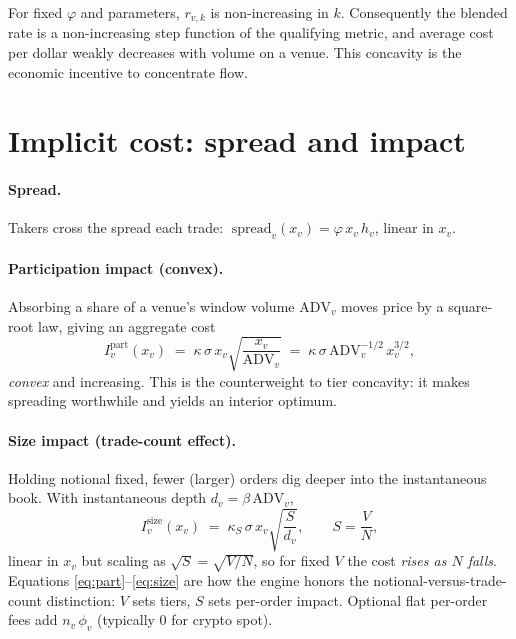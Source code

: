 \documentclass[11pt]{article}
\begin{document}
\begin{proposition}
For fixed $\varphi$ and parameters, $r_{v,k}$ is non-increasing in $k$.
Consequently the blended rate is a non-increasing step function of the
qualifying metric, and average cost per dollar weakly decreases with volume on a
venue. This concavity is the economic incentive to concentrate flow.
\end{proposition}

\section{Implicit cost: spread and impact}
\paragraph{Spread.} Takers cross the spread each trade:
$\;\text{spread}_v(x_v) = \varphi\,x_v\,h_v$, linear in $x_v$.

\paragraph{Participation impact (convex).} Absorbing a share of a venue's window
volume $\mathrm{ADV}_v$ moves price by a square-root law, giving an aggregate
cost
\begin{equation}
I^{\text{part}}_v(x_v) \;=\; \kappa\,\sigma\,x_v\sqrt{\frac{x_v}{\mathrm{ADV}_v}}
\;=\; \kappa\,\sigma\,\mathrm{ADV}_v^{-1/2}\,x_v^{3/2},
\label{eq:part}
\end{equation}
\emph{convex} and increasing. This is the counterweight to tier concavity: it
makes spreading worthwhile and yields an interior optimum.

\paragraph{Size impact (trade-count effect).} Holding notional fixed, fewer
(larger) orders dig deeper into the instantaneous book. With instantaneous depth
$d_v=\beta\,\mathrm{ADV}_v$,
\begin{equation}
I^{\text{size}}_v(x_v) \;=\; \kappa_S\,\sigma\,x_v\sqrt{\frac{S}{d_v}},
\qquad S=\frac{V}{N},
\label{eq:size}
\end{equation}
linear in $x_v$ but scaling as $\sqrt{S}=\sqrt{V/N}$, so for fixed $V$ the cost
\emph{rises as $N$ falls}. Equations \eqref{eq:part}--\eqref{eq:size} are how the
engine honors the notional-versus-trade-count distinction: $V$ sets tiers, $S$
sets per-order impact. Optional flat per-order fees add $n_v\,\phi_v$ (typically
$0$ for crypto spot).
\end{document}
